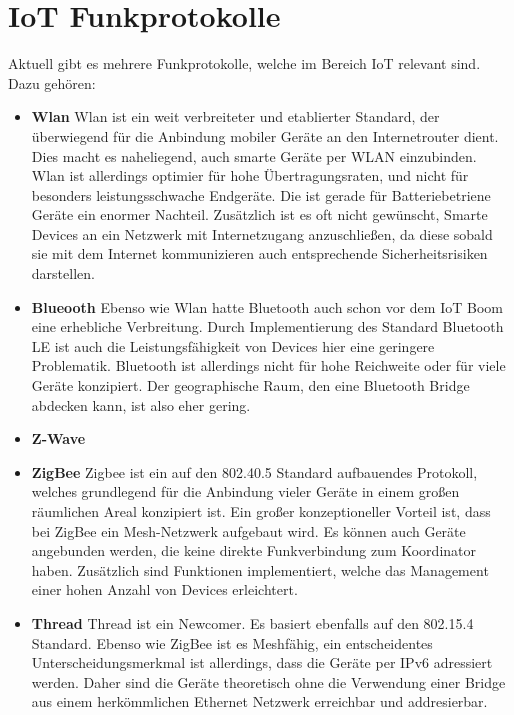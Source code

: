 \section{IoT Funkprotokolle}
Aktuell gibt es mehrere Funkprotokolle, welche im Bereich IoT relevant sind. Dazu gehören:
\begin{itemize}
    \item \textbf{Wlan}
    Wlan ist ein weit verbreiteter und etablierter Standard, der überwiegend für die Anbindung mobiler Geräte an den
    Internetrouter dient. Dies macht es naheliegend, auch smarte Geräte per WLAN einzubinden. Wlan ist allerdings 
    optimier für hohe Übertragungsraten, und nicht für besonders leistungsschwache Endgeräte. Die ist
    gerade für Batteriebetriene Geräte ein enormer Nachteil. Zusätzlich ist es oft nicht gewünscht, Smarte Devices
    an ein Netzwerk mit Internetzugang anzuschließen, da diese sobald sie mit dem Internet kommunizieren auch entsprechende
    Sicherheitsrisiken darstellen.

    \item \textbf{Blueooth}
    Ebenso wie Wlan hatte Bluetooth auch schon vor dem IoT Boom eine erhebliche Verbreitung. Durch Implementierung 
    des Standard Bluetooth LE ist auch die Leistungsfähigkeit von Devices hier eine geringere Problematik. Bluetooth
    ist allerdings nicht für hohe Reichweite oder für viele Geräte konzipiert. Der geographische Raum, den eine Bluetooth
    Bridge abdecken kann, ist also eher gering.

    \item \textbf{Z-Wave}
    
    \item \textbf{ZigBee}
    Zigbee ist ein auf den 802.40.5 Standard aufbauendes Protokoll, welches grundlegend für die Anbindung vieler
    Geräte in einem großen räumlichen Areal konzipiert ist. Ein großer konzeptioneller Vorteil ist, dass bei 
    ZigBee ein Mesh-Netzwerk aufgebaut wird. Es können auch Geräte angebunden werden, die keine direkte Funkverbindung
    zum Koordinator haben. Zusätzlich sind Funktionen implementiert, welche das Management einer hohen Anzahl von Devices
    erleichtert.
    
    \item \textbf{Thread}
    Thread ist ein Newcomer. Es basiert ebenfalls auf den 802.15.4 Standard. Ebenso wie ZigBee ist es Meshfähig, ein
    entscheidentes Unterscheidungsmerkmal ist allerdings, dass die Geräte per IPv6 adressiert werden. Daher sind die Geräte
    theoretisch ohne die Verwendung einer Bridge aus einem herkömmlichen Ethernet Netzwerk erreichbar und addresierbar.
\end{itemize}

